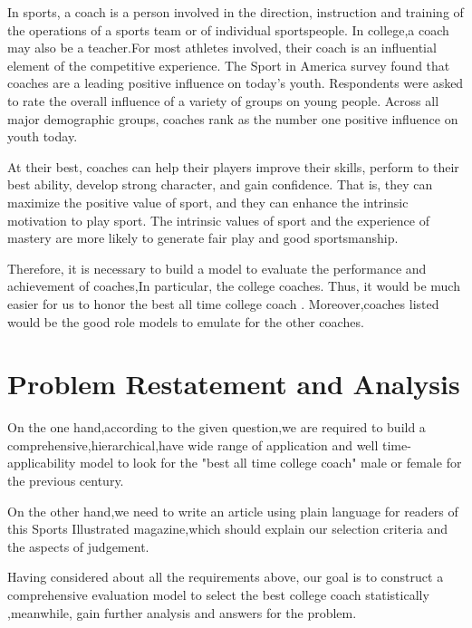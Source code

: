 \documentclass{mcmthesis}
\begin{document}
\par In sports, a coach is a person involved in the direction, instruction and training of the operations of a sports team or of individual sportspeople. In college,a coach may also be a teacher.For most athletes involved, their coach is an influential element of the competitive experience. The Sport in America survey found that coaches are a leading positive\cite{1} influence on today's youth. Respondents were asked to rate the overall influence of a variety of groups on young people. Across all major demographic groups, coaches rank as the number one positive influence on youth today.
\par At their best, coaches can help their players improve their skills, perform to their best ability, develop strong character, and gain confidence. That is, they can maximize the positive value of sport, and they can enhance the intrinsic motivation to play sport. The intrinsic values of sport and the experience of mastery are more likely to generate fair play and good sportsmanship.
\par Therefore, it is necessary to build a model to evaluate the performance and achievement of coaches,In particular, the college coaches. Thus, it would be much easier for us to honor the best all time college coach . Moreover,coaches listed would be the good role models to emulate for the other coaches. 


\section{Problem Restatement and Analysis} 
\par On the one hand,according to the given question,we are required to build a comprehensive,hierarchical,have wide range of application and well time-applicability model to look for the "best all time college coach" male or female for the previous century.
\par On the other hand,we need to write an article using plain language for readers of this Sports Illustrated magazine,which should explain our selection criteria and the aspects of judgement.
\par Having considered about all the requirements above, our goal is to construct  a comprehensive evaluation model to select the best college coach statistically ,meanwhile, gain further analysis and answers for the problem. 
\end{document}
